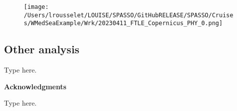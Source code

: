 \documentclass{article}%
\begin{document}
%


\begin{figure}[h!]%
\centering%
\texttt{[image: /Users/lrousselet/LOUISE/SPASSO/GitHubRELEASE/SPASSO/Cruises/WMedSeaExample/Wrk/20230411\_FTLE\_Copernicus\_PHY\_0.png]}%
\end{figure}

%
\clearpage

%
\subsection{Other analysis}%
\label{subsec:Otheranalysis}%
Type here.

%
\begin{center}%
\textbf{Acknowledgments}%
\end{center}%
Type here.%
\end{document}
